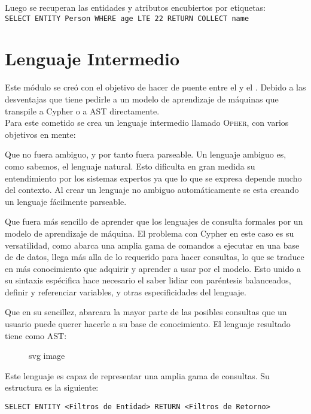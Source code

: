 Luego se recuperan las entidades y atributos encubiertos por etiquetas:\\
\verb|SELECT ENTITY Person WHERE age LTE 22 RETURN COLLECT name|\\



\section{Lenguaje Intermedio}
\label{inter-lang}
Este m\'odulo se cre\'o con el objetivo de hacer de puente entre el  y el . Debido a las desventajas que tiene pedirle a un modelo de aprendizaje de m\'aquinas que transpile a Cypher o a AST directamente.\\

Para este cometido se crea un lenguaje intermedio llamado \textsc{Opher}, con varios objetivos en mente:

Que no fuera ambiguo, y por tanto fuera parseable. Un lenguaje ambiguo es, como sabemos, el lenguaje natural. Esto dificulta en gran medida su entendimiento por los sistemas expertos ya que lo que se expresa depende mucho del contexto. Al crear un lenguaje no ambiguo autom\'aticamente se esta creando un lenguaje f\'acilmente parseable.

Que fuera más sencillo de aprender que los lenguajes de consulta formales por un modelo de aprendizaje de máquina. El problema con Cypher en este caso es su versatilidad, como abarca una amplia gama de comandos a ejecutar en una base de de datos, llega m\'as alla de lo requerido para hacer consultas, lo que se traduce en m\'as conocimiento que adquirir y aprender a usar por el modelo. Esto unido a su sintaxis esp\'ecifica hace necesario el saber lidiar con par\'entesis balanceados, definir y referenciar variables, y otras especificidades del lenguaje.

Que en su sencillez, abarcara la mayor parte de las posibles consultas que un usuario puede querer hacerle a su base de conocimiento. El lenguaje resultado tiene como AST:

    
\begin{figure}[htbp]
  \centering
  
  \caption{svg image}
\end{figure}

Este lenguaje es capaz de representar una amplia gama de consultas. Su estructura es la siguiente:

\verb|SELECT ENTITY <Filtros de Entidad> RETURN <Filtros de Retorno>|\\

